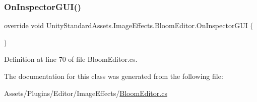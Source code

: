\subsubsection{\texorpdfstring{On\+Inspector\+G\+U\+I()}{OnInspectorGUI()}}
{\footnotesize\ttfamily override void Unity\+Standard\+Assets.\+Image\+Effects.\+Bloom\+Editor.\+On\+Inspector\+G\+UI (\begin{DoxyParamCaption}{ }\end{DoxyParamCaption})}



Definition at line 70 of file Bloom\+Editor.\+cs.



The documentation for this class was generated from the following file\+:\begin{DoxyCompactItemize}
\item 
Assets/\+Plugins/\+Editor/\+Image\+Effects/\mbox{\hyperlink{_bloom_editor_8cs}{Bloom\+Editor.\+cs}}\end{DoxyCompactItemize}
